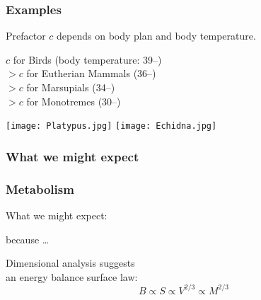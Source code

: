 \begin{frame}
  \frametitle{Examples}

  Prefactor $c$ depends on 
  body plan and body temperature.

  $c$ for Birds (body temperature: 39--)\\
  $> c$ for Eutherian Mammals (36--)\\
  $> c$ for Marsupials  (34--)\\
  $> c$ for Monotremes (30--)

  \begin{center}
    \texttt{[image: Platypus.jpg]}
    \quad
    \texttt{[image: Echidna.jpg]}
  \end{center}




\end{frame}

\begin{frame}
  \frametitle{What we might expect} 


\end{frame}

\begin{frame}
  \frametitle{Metabolism}

What we might expect:

\begin{center}
 because \ldots

Dimensional analysis suggests\\ 
an energy balance surface law:\\
$$ B \propto S \propto V^{2/3} \propto M^{2/3}$$
\end{center}


\end{frame}

